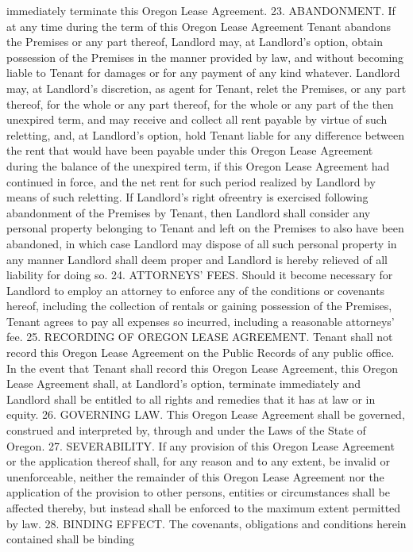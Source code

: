 immediately terminate this Oregon Lease Agreement.
23. ABANDONMENT. If at any time during the term of this Oregon Lease Agreement Tenant
abandons the Premises or any part thereof, Landlord may, at Landlord's option, obtain
possession of the Premises in the manner provided by law, and without becoming liable to
Tenant for damages or for any payment of any kind whatever. Landlord may, at Landlord's
discretion, as agent for Tenant, relet the Premises, or any part thereof, for the whole or any part
thereof, for the whole or any part of the then unexpired term, and may receive and collect all rent
payable by virtue of such reletting, and, at Landlord's option, hold Tenant liable for any difference
between the rent that would have been payable under this Oregon Lease Agreement during the
balance of the unexpired term, if this Oregon Lease Agreement had continued in force, and the
net rent for such period realized by Landlord by means of such reletting. If Landlord's right ofreentry is exercised following abandonment of the Premises by Tenant, then Landlord shall
consider any personal property belonging to Tenant and left on the Premises to also have been
abandoned, in which case Landlord may dispose of all such personal property in any manner
Landlord shall deem proper and Landlord is hereby relieved of all liability for doing so.
24. ATTORNEYS' FEES. Should it become necessary for Landlord to employ an attorney to enforce
any of the conditions or covenants hereof, including the collection of rentals or gaining
possession of the Premises, Tenant agrees to pay all expenses so incurred, including a
reasonable attorneys' fee.
25. RECORDING OF OREGON LEASE AGREEMENT. Tenant shall not record this Oregon Lease
Agreement on the Public Records of any public office. In the event that Tenant shall record this
Oregon Lease Agreement, this Oregon Lease Agreement shall, at Landlord's option, terminate
immediately and Landlord shall be entitled to all rights and remedies that it has at law or in equity.
26. GOVERNING LAW. This Oregon Lease Agreement shall be governed, construed and interpreted
by, through and under the Laws of the State of Oregon.
27. SEVERABILITY. If any provision of this Oregon Lease Agreement or the application thereof
shall, for any reason and to any extent, be invalid or unenforceable, neither the remainder of this
Oregon Lease Agreement nor the application of the provision to other persons, entities or
circumstances shall be affected thereby, but instead shall be enforced to the maximum extent
permitted by law.
28. BINDING EFFECT. The covenants, obligations and conditions herein contained shall be binding
